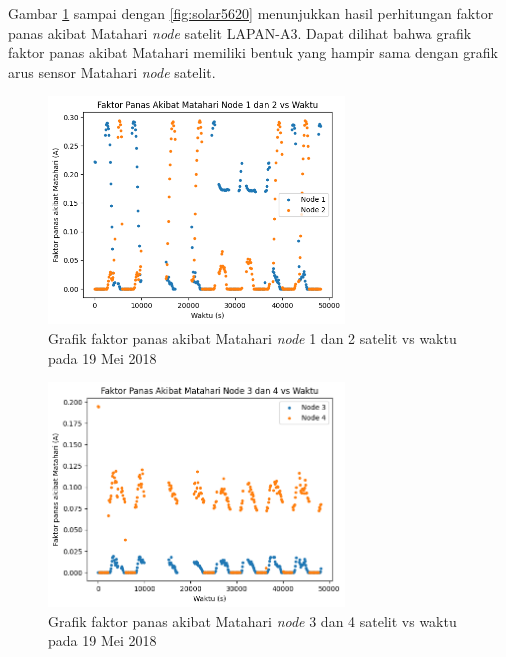 Gambar \ref{fig:solar1219} sampai dengan \ref{fig:solar5620} menunjukkan hasil
perhitungan faktor panas akibat Matahari \textit{node} satelit LAPAN-A3. Dapat dilihat bahwa grafik faktor panas akibat Matahari memiliki bentuk yang hampir sama dengan grafik arus sensor Matahari \textit{node} satelit.

\begin{figure}[H]
\setlength{}
\begin{center}
\includegraphics[width=0.7\textwidth]{fig/solar_node12_2018-05-19.png}
	\caption{Grafik faktor panas akibat Matahari \textit{node} 1 dan 2 satelit vs waktu pada 19 Mei 2018}
\label{fig:solar1219}
\end{center}
\end{figure}

\begin{figure}[H]
\setlength{}
\begin{center}
\includegraphics[width=0.7\textwidth]{fig/solar_node34_2018-05-19.png}
	\caption{Grafik faktor panas akibat Matahari \textit{node} 3 dan 4 satelit vs waktu pada 19 Mei 2018}
\label{fig:solar3419}
\end{center}
\end{figure}

